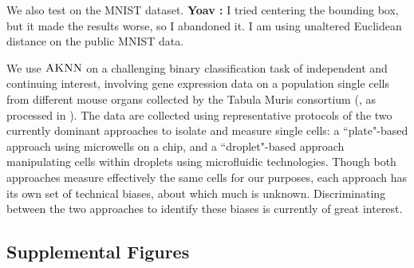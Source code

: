 \documentclass{article}
\newcommand{\algname}{\textsc{AKNN}}
\newcommand{\comment}[3]{{\color{#1} {\bf #2 :} #3}}
\newcommand{\yoav}[1]{\comment{green}{Yoav}{#1}}
\begin{document}
We also test on the MNIST dataset. \yoav{I tried centering the bounding box, but it made the results worse, so I abandoned it. I am using unaltered Euclidean distance on the public MNIST data.}

We use $\algname$ on a challenging binary classification task of independent and continuing interest, involving gene expression data on a population single cells from different mouse organs collected by the Tabula Muris consortium (\cite{tabulamuris18}, as processed in \cite{MouseAtlasData}). The data are collected using representative protocols of the two currently dominant approaches to isolate and measure single cells: a ``plate"-based approach using microwells on a chip, and a ``droplet"-based approach manipulating cells within droplets using microfluidic technologies. Though both approaches measure effectively the same cells for our purposes, each approach has its own set of technical biases, about which much is unknown. Discriminating between the two approaches to identify these biases is currently of great interest.


\newpage
\subsection{Supplemental Figures}
\end{document}
